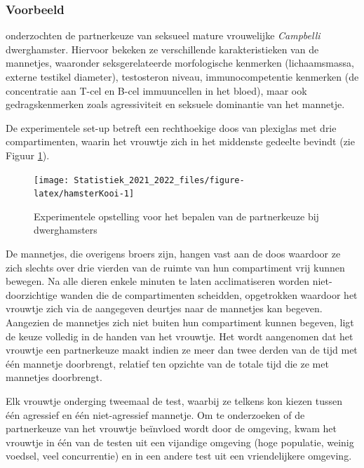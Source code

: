 \documentclass[
  12pt,dutch,coursenotes]{book}
\theoremstyle{definition}
\theoremstyle{definition}
\theoremstyle{definition}
\theoremstyle{definition}
\theoremstyle{remark}
\begin{document}
\hypertarget{voorbeeld}{%
\subsubsection{Voorbeeld}\label{voorbeeld}}

\citet{Rogovin2017} onderzochten de partnerkeuze van seksueel mature vrouwelijke \emph{Campbelli} dwerghamster.
Hiervoor bekeken ze verschillende karakteristieken van de mannetjes, waaronder seksgerelateerde morfologische kenmerken (lichaamsmassa, externe testikel diameter), testosteron niveau, immunocompetentie kenmerken (de concentratie aan T-cel en B-cel immuuncellen in het bloed), maar ook gedragskenmerken zoals agressiviteit en seksuele dominantie van het mannetje.

De experimentele set-up betreft een rechthoekige doos van plexiglas met drie compartimenten, waarin het vrouwtje zich in het middenste gedeelte bevindt (zie Figuur \ref{fig:hamsterKooi}).

\begin{figure}

{\centering \texttt{[image: Statistiek\_2021\_2022\_files/figure-latex/hamsterKooi-1]} 

}

\caption{Experimentele opstelling voor het bepalen van de partnerkeuze bij dwerghamsters}\label{fig:hamsterKooi}
\end{figure}

De mannetjes, die overigens broers zijn, hangen vast aan de doos waardoor ze zich slechts over drie vierden van de ruimte van hun compartiment vrij kunnen bewegen. Na alle dieren enkele minuten te laten acclimatiseren worden niet-doorzichtige wanden die de compartimenten scheidden, opgetrokken waardoor het vrouwtje zich via de aangegeven deurtjes naar de mannetjes kan begeven. Aangezien de mannetjes zich niet buiten hun compartiment kunnen begeven, ligt de keuze volledig in de handen van het vrouwtje. Het wordt aangenomen dat het vrouwtje een partnerkeuze maakt indien ze meer dan twee derden van de tijd met één mannetje doorbrengt, relatief ten opzichte van de totale tijd die ze met mannetjes doorbrengt.

Elk vrouwtje onderging tweemaal de test, waarbij ze telkens kon kiezen tussen één agressief en één niet-agressief mannetje. Om te onderzoeken of de partnerkeuze van het vrouwtje beïnvloed wordt door de omgeving, kwam het vrouwtje in één van de testen uit een vijandige omgeving (hoge populatie, weinig voedsel, veel concurrentie) en in een andere test uit een vriendelijkere omgeving.
\end{document}
